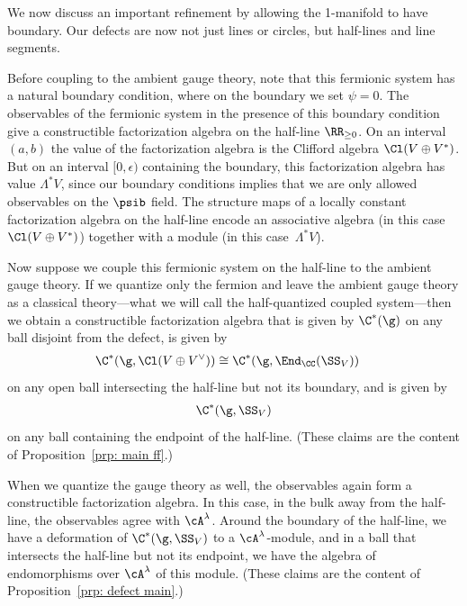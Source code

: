\documentclass[10pt]{amsart}
\begin{document}
We now discuss an important refinement by allowing the 1-manifold to have boundary. 
Our defects are now not just lines or circles, but half-lines and line segments.

Before coupling to the ambient gauge theory,
note that this fermionic system has a natural boundary condition, where on the boundary we set $\psi = 0$.  
The observables of the fermionic system in the presence of this boundary condition give a constructible factorization algebra on the half-line $\RR_{\ge 0}$.  
On an interval $(a,b)$ the value of the factorization algebra is the Clifford algebra $\Cl(V \oplus V^*)$. 
But on an interval $[0,\epsilon)$ containing the boundary, this factorization algebra has value $\Lambda^\ast V$,
since our boundary conditions implies that we are only allowed observables on the $\psib$ field.  
The structure maps of a locally constant factorization algebra on the half-line encode an associative algebra (in this case $\Cl(V \oplus V^*)$) together with a module (in this case~$\Lambda^\ast V$).   

Now suppose we couple this fermionic system on the half-line to the ambient gauge theory. 
If we quantize only the fermion and leave the ambient gauge theory as a classical theory---what we 
will call the half-quantized coupled system---then we obtain a constructible factorization algebra that is given by $\C^*(\g)$ on any ball disjoint from the defect, is given by 
\begin{align*}
\C^*(\g,\Cl(V \oplus V^\vee)) &\cong \C^*(\g,\End_\CC(\SS_V)) 
\end{align*}
on any open ball intersecting the half-line but not its boundary, and is given by
\begin{align*}
\C^*(\g,\SS_V) 
\end{align*}
on any ball containing the endpoint of the half-line.
(These claims are the content of Proposition~\ref{prp: main ff}.)

When we quantize the gauge theory as well, 
the observables again form a constructible factorization algebra.
In this case, in the bulk away from the half-line, the observables agree with $\cA^\lambda$.
Around the boundary of the half-line, we have a deformation of $\C^*(\g,\SS_V) $ to a $\cA^\lambda$-module,
and in a ball that intersects the half-line but not its endpoint, 
we have the algebra of endomorphisms over $\cA^\lambda$ of this module.
(These claims are the content of Proposition~\ref{prp: defect main}.)
\end{document}
